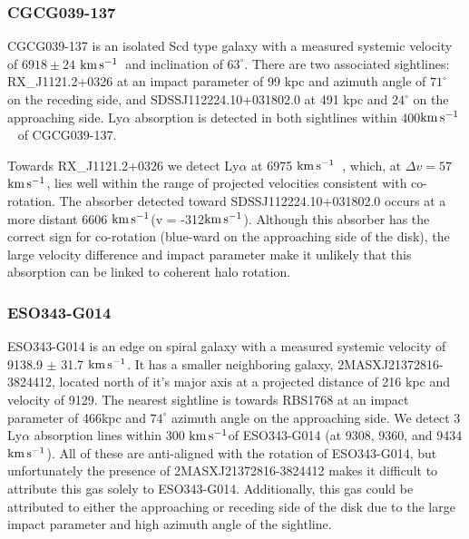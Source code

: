\documentclass[iop]{emulateapj-rtx4}
\newcommand{\kms}{$\rm km\, s^{-1}$}
\begin{document}
\subsubsection{CGCG039-137}

CGCG039-137 is an isolated Scd type galaxy with a measured systemic velocity of $6918 \pm 24$ \kms~and inclination of $63^{\circ}$. There are two associated sightlines: RX\_J1121.2+0326 at an impact parameter of 99 kpc and azimuth angle of $71^{\circ}$ on the receding side, and SDSSJ112224.10+031802.0 at 491 kpc and $24^{\circ}$ on the approaching side. Ly$\alpha$ absorption is detected in both sightlines within $400$\kms~ of CGCG039-137. 

Towards RX\_J1121.2+0326 we detect Ly$\alpha$ at 6975 \kms~, which, at $\Delta v = 57$ \kms, lies well within the range of projected velocities consistent with co-rotation. The absorber detected toward SDSSJ112224.10+031802.0 occurs at a more distant 6606 \kms (\Delta v = -312\kms). Although this absorber has the correct sign for co-rotation (blue-ward on the approaching side of the disk), the large velocity difference and impact parameter make it unlikely that this absorption can be linked to coherent halo rotation.


%
%


\subsubsection{ESO343-G014}
ESO343-G014 is an edge on spiral galaxy with a measured systemic velocity of 9138.9 $\pm$ 31.7 \kms. It has a smaller neighboring galaxy, 2MASXJ21372816-3824412, located north of it's major axis at a projected distance of 216 kpc and velocity of 9129. The nearest sightline is towards RBS1768 at an impact parameter of 466kpc and $74^{\circ}$ azimuth angle on the approaching side. We detect 3 Ly$\alpha$ absorption lines within 300 \kms of ESO343-G014 (at 9308, 9360, and 9434 \kms). All of these are anti-aligned with the rotation of ESO343-G014, but unfortunately the presence of 2MASXJ21372816-3824412 makes it difficult to attribute this gas solely to ESO343-G014. Additionally, this gas could be attributed to either the approaching or receding side of the disk due to the large impact parameter and high azimuth angle of the sightline.
\end{document}
